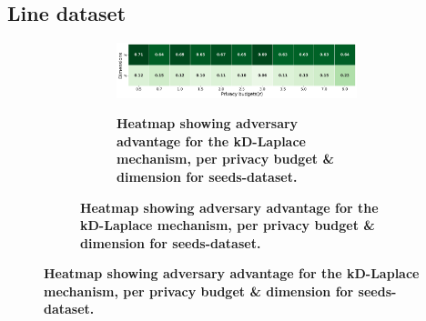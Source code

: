 \subsection{Line dataset}
\begin{figure}[H]
    \centering
    \begin{subfigure}[b]{0.85\textwidth}
        \begin{subfigure}[c]{1\textwidth}
            \caption{\textbf{Heatmap showing adversary advantage for the kD-Laplace mechanism, per privacy budget \& dimension for seeds-dataset.}}
            \includegraphics[width=1\textwidth]{Results/kd-laplace/kd-Laplace/line-dataset/shokri_mi_adv.png}
            \label{fig:privacy_line-dataset_adversial_advantage_kd-laplace}
        \end{subfigure}
        \vfill %


\end{subfigure}
\end{figure}
